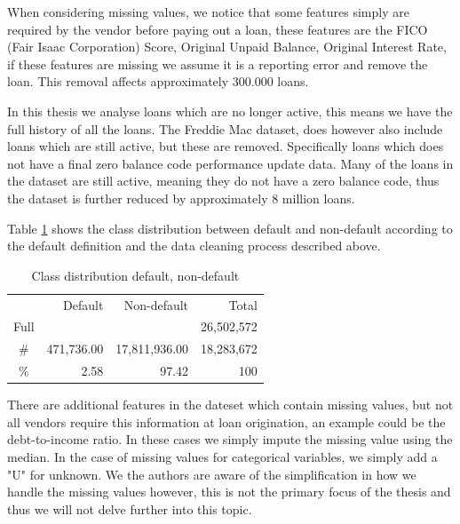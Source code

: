 When considering missing values, we notice that some features simply are required by the vendor before paying out a loan, these features are the FICO (Fair Isaac Corporation) Score, Original Unpaid Balance, Original Interest Rate, if these features are missing we assume it is a reporting error and remove the loan. This removal affects approximately 300.000 loans. 


In this thesis we analyse loans which are no longer active, this means we have the full history of all the loans. The Freddie Mac dataset, does however also include loans which are still active, but these are removed. 
Specifically loans which does not have a final zero balance code performance update data. Many of the loans in the dataset are still active, meaning they do not have a zero balance code, thus the dataset is further reduced by approximately 8 million loans. 

Table \ref{tab:default_amount} shows the class distribution between default and non-default according to the default definition and the data cleaning process described above. 

\begin{table}[H]
    \centering
    \caption{Class distribution default, non-default}
    \label{tab:default_amount}
    \begin{tabular}{crrr}
    \toprule
         & Default & Non-default & Total\\
         Full & & & 26,502,572 \\
         \# &  471,736.00 & 17,811,936.00 & 18,283,672\\
         \% &  2.58 & 97.42 & 100\\
        \bottomrule
    \end{tabular}
    \end{table}

There are additional features in the dateset which contain missing values, but not all vendors require this information at loan origination, an example could be the debt-to-income ratio. In these cases we simply impute the missing value using the median. In the case of missing values for categorical variables, we simply add a "U" for unknown. We the authors are aware of the simplification in how we handle the missing values however, this is not the primary focus of the thesis and thus we will not delve further into this topic.


